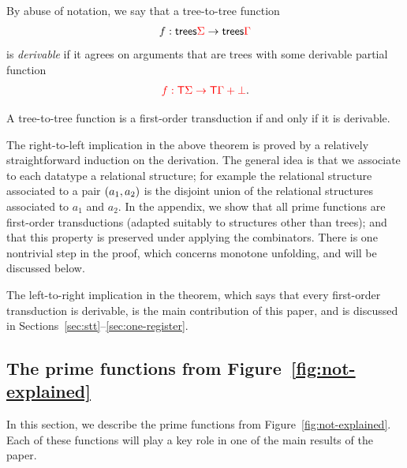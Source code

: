 
By abuse of notation, we say that a tree-to-tree function  
    \begin{align*}
        f : \mathsf {trees} {\color{red}{\Sigma}} \to \mathsf {trees} {\color{red}{\Gamma}}
    \end{align*}
    is \emph{derivable} if it agrees on arguments that are trees with some derivable partial function
    \begin{align*}
        {\color{red}{f : {\color{red}{\mathsf T}}\Sigma \to {\color{red}{\mathsf T}}\Gamma + {\color{red}{\bot}}}}.
    \end{align*}

\begin{theorem}\label{thm:main} A tree-to-tree function is a first-order transduction if and only if it is derivable.
\end{theorem}


The right-to-left implication in the above theorem is proved by a relatively straightforward induction on the derivation. The general idea is that we associate to each datatype a relational structure; for example the relational structure associated to a pair $(a_1,a_2)$ is the disjoint union of the relational structures associated to $a_1$ and $a_2$.  In the appendix, we show that all prime functions are first-order transductions (adapted suitably to structures other than trees); and that this property is preserved under applying the combinators. There is one nontrivial step in the proof, which concerns monotone unfolding, and will be discussed below.  

The  left-to-right implication in the theorem, which says that every first-order transduction is derivable, is the main contribution of this paper, and is discussed in Sections~\ref{sec:stt}--\ref{sec:one-register}.


%
\subsection{The prime functions from Figure~\ref{fig:not-explained}}
\label{sec:prime-and-combinators}
In this section, we  describe the prime functions from Figure~\ref{fig:not-explained}. 
Each of these functions will play a key role in one of the main results of the paper.


